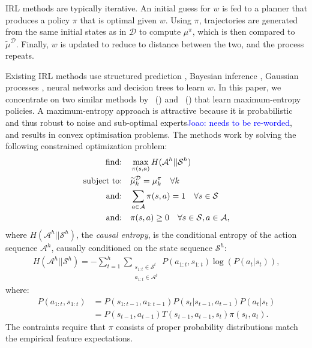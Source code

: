 \documentclass[letterpaper]{article}
\newcommand{\citet}[1]{\citeauthor{#1}~(\citeyear{#1})}
\newcommand{\jm}[1]{\textcolor{blue}{Joao: #1}}
\newcommand{\jm}[1]{}
\begin{document}
IRL methods are typically iterative. An initial guess for $w$ is fed to a planner that produces a policy $\pi$ that is optimal given $w$.  Using $\pi$, trajectories are generated from the same initial states as in $\mathcal{D}$ to compute $\mu^{\pi}$, which is then compared to $\widetilde{\mu}^{\mathcal{D}}$.  Finally, $w$ is updated to reduce to distance between the two, and the process repeats.

Existing IRL methods use structured prediction \cite{ratliff2006maximum}, Bayesian inference \cite{ramachandran2007bayesian}, Gaussian processes \cite{levine2011nonlinear}, neural networks and decision trees \cite{ratliff2007boosting} to learn $w$.  In this paper, we concentrate on two similar methods by \citet{ziebart2008maximum} and \citet{ziebart2010modelingthesis} that learn maximum-entropy policies.  A maximum-entropy approach is attractive because it is probabilistic and thus robust to noise and sub-optimal experts\jm{needs to be re-worded}, and results in convex optimisation problems. The methods work by solving the following constrained optimization problem:
\begin{align}
	\hbox{find:} &\quad\max\limits_{\pi(s,a)} H(\mathcal{A}^h||\mathcal{S}^h)\label{eq:primal_obj}\\
\hbox{subject to:}&\quad\widetilde{\mu}^{\mathcal{D}}_k   = \mu^{\pi}_k\quad\forall k \label{eq:features_equality_constraint}\\
\hbox{and:} &\quad\sum_{a\in\mathcal{A}}\pi(s,a)  = 1\quad\forall s\in\mathcal{S}\\
\hbox{and:} &\quad\pi(s,a) \geq 0\quad\forall s\in\mathcal{S},a\in\mathcal{A},  
\end{align}
where $H(\mathcal{A}^h||\mathcal{S}^h)$, the \emph{causal entropy}, is the conditional entropy of the action sequence $\mathcal{A}^h$, causally conditioned on the state sequence $\mathcal{S}^h$:
\begin{align}
H(\mathcal{A}^h||\mathcal{S}^h) = -\sum_{t=1}^h \sum_{\substack{s_{1:t}\in\mathcal{S}^t\\a_{1:t}\in\mathcal{A}^t}} P(a_{1:t},s_{1:t})\log(P(a_t|s_t)),
\label{eg:entdef}
\end{align}
where:
\begin{align*}
  P(a_{1:t},s_{1:t})&= P(s_{1:t-1},a_{1:t-1})P(s_t|s_{t-1},a_{t-1})P(a_t|s_t)\\
  &=P(s_{t-1},a_{t-1})T(s_{t-1},a_{t-1},s_t)\pi(s_t,a_t).
\end{align*}
The contraints require that $\pi$ consists of proper probability distributions match the empirical feature expectations.
\end{document}
